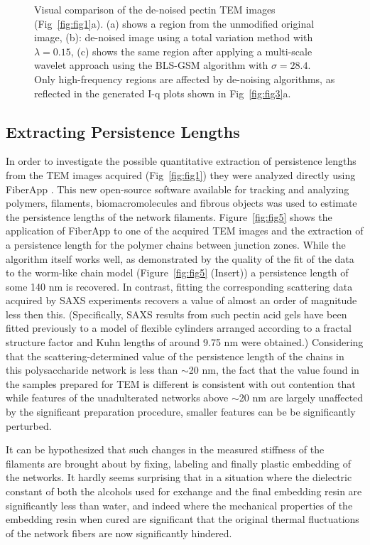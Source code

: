 \begin{figure}[!h]
\begin{subfigure}{0.32\textwidth}
  \end{subfigure}
  \caption{Visual comparison of the de-noised pectin TEM images (Fig~\ref{fig:fig1}a). (a) shows a region from the unmodified original image, (b): de-noised image using a total variation method \cite{barbero_modular_2014} with $\lambda = 0.15$, (c) shows the same region after applying a multi-scale wavelet approach using the BLS-GSM algorithm \cite{portilla_image_2003} with $\sigma = 28.4$. Only high-frequency regions are affected by de-noising algorithms, as reflected in the generated I-q plots shown in Fig~\ref{fig:fig3}a.
}\label{fig:denoised_images}
\end{figure}


\subsection{Extracting Persistence Lengths}
In order to investigate the possible quantitative extraction of persistence lengths from the TEM images acquired (Fig~\ref{fig:fig1}) they were analyzed directly using FiberApp \cite{usov2015}. This new open-source software available for tracking and analyzing polymers, filaments, biomacromolecules and fibrous objects was used to estimate the persistence lengths of the network filaments. Figure~\ref{fig:fig5} shows the application of FiberApp to one of the acquired TEM images and the extraction of a persistence length for the polymer chains between junction zones. While the algorithm itself works well, as demonstrated by the quality of the fit of the data to the worm-like chain model (Figure~\ref{fig:fig5} (Insert)) a persistence length of some 140 nm is recovered. In contrast, fitting the corresponding scattering data acquired by SAXS experiments recovers a value of almost an order of magnitude less then this. (Specifically, SAXS results from such pectin acid gels have been fitted previously to a model of flexible cylinders arranged according to a fractal structure factor \cite{mansel_zooming_2015} and Kuhn lengths of around 9.75 nm were obtained.) Considering that the scattering-determined value of the persistence length of the chains in this polysaccharide network is less than $\sim$20 nm, the fact that the value found in the samples prepared for TEM is different is consistent with out contention that while features of the unadulterated networks above $\sim$20 nm are largely unaffected by the significant preparation procedure, smaller features can be be significantly perturbed.


It can be hypothesized that such changes in the measured stiffness of the filaments are brought about by fixing, labeling and finally plastic embedding of the networks. It hardly seems surprising that in a situation where the dielectric constant of both the alcohols used for exchange and the final embedding resin are significantly less than water, and indeed where the mechanical properties of the embedding resin when cured are significant that the original thermal fluctuations of the network fibers are now significantly hindered. 

